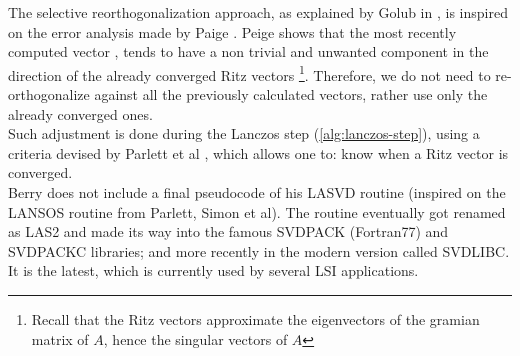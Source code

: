 The selective reorthogonalization approach, as explained by Golub in
\cite{golub13}, is inspired on the error analysis made by Paige
  \cite{paige71}. Peige shows that the most recently computed vector
  , tends to have a non trivial and unwanted
  component in the direction of the already converged Ritz vectors
  \footnote{Recall that the Ritz vectors approximate the eigenvectors
    of the gramian matrix of $A$, hence the singular vectors of
    $A$}. Therefore, we do not need to re-orthogonalize against all
  the previously calculated vectors, rather use only the already
  converged ones. \\

Such adjustment is done during the Lanczos step
(\cref{alg:lanczos-step}), using a criteria devised by Parlett et al
\cite{parlett79}, which allows one to: know when a Ritz vector is
converged. \\

Berry does not include a final pseudocode of his LASVD
routine (inspired on the LANSOS routine from Parlett, Simon et
al). The routine eventually got renamed as LAS2 and made its way into
the famous SVDPACK (Fortran77) and SVDPACKC libraries; and more
recently in the modern version called SVDLIBC. It is the latest, which
is currently used by several LSI applications. 



